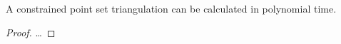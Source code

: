\begin{theorem}
  A constrained point set triangulation can be calculated in polynomial time.
\end{theorem}

\begin{proof}
  \ldots{}
\end{proof}


% 
% 
% 
% 
% 

